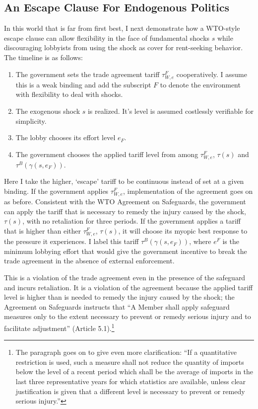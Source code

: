 \documentclass[12pt]{article}
\newcommand{\ga}{\gamma}
\begin{document}
\subsection{An Escape Clause For Endogenous Politics}
\label{sec:ECendog}
In this world that is far from first best, I next demonstrate how a WTO-style escape clause can allow flexibility in the face of fundamental shocks $s$ while discouraging lobbyists from using the shock as cover for rent-seeking behavior. The timeline is as follows:
\begin{enumerate}
	\item The government sets the trade agreement tariff $\tau^F_{W,e}$ cooperatively. I assume this is a weak binding and add the subscript $F$ to denote the environment with flexibility to deal with shocks.
	\item The exogenous shock $s$ is realized. It's level is assumed costlessly verifiable for simplicity.
	\item The lobby chooses its effort level $e_F$.
	\item The government chooses the applied tariff level from among $\tau^F_{W,e}$, $\tau(s)$ and $\tau^B(\ga(s,e_F))$.
\end{enumerate}
Here I take the higher, `escape' tariff to be continuous instead of set at a given binding. If the government applies $\tau^F_{W,e}$, implementation of the agreement goes on as before. Consistent with the WTO Agreement on Safeguards, the government can apply the tariff that is necessary to remedy the injury caused by the shock, $\tau(s)$, with no retaliation for three periods. If the government applies a tariff that is higher than either $\tau^F_{W,e}$, $\tau(s)$, it will choose its myopic best response to the pressure it experiences. I label this tariff $\tau^B(\ga(s,e_F))$, where $e^F$ is the minimum lobbying effort that would give the government incentive to break the trade agreement in the absence of external enforcement.

This is a violation of the trade agreement even in the presence of the safeguard and incurs retaliation. It is a violation of the agreement because the applied tariff level is higher than is needed to remedy the injury caused by the shock; the Agreement on Safeguards instructs that ``A Member shall apply safeguard measures only to the extent necessary to prevent or remedy serious injury and to facilitate adjustment'' (Article 5.1).\footnote{The paragraph goes on to give even more clarification: ``If a quantitative restriction is used, such a measure shall  not reduce the quantity of imports below the level of a recent period which shall be the average of imports in the last three representative years for which statistics are available, unless clear justification is given that a different level is necessary to prevent or remedy serious injury.''}
\end{document}
